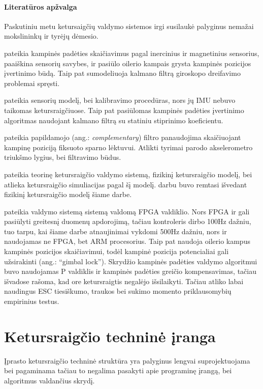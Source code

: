 \documentclass[12pt, a4paper, lithuanian, final]{article}
\begin{document}
\paragraph{Literatūros apžvalga}

Paskutiniu metu ketursaigčių valdymo sistemos irgi susilaukė palyginus nemažai mokslininkų ir tyrėjų dėmesio.

\cite{abyarjoo2015implementing} pateikia kampinės padėties skaičiavimus pagal inercinius ir magnetinius sensorius, paaiškina sensorių savybes, ir pasiūlo oilerio kampais grysta kampinės pozicijos įvertinimo būdą.
Taip pat sumodeliuoja kalmano filtrą giroskopo dreifavimo problemai spręsti.


\cite{kumar2004estimation} pateikia sensorių modelį, bei kalibravimo procedūras, nors jų IMU nebuvo taikomas ketursraigčiuose.
Taip pat pasiūlomas kampinės padėties įvertinimo algoritmas naudojant kalmano filtrą su statiniu stiprinimo koeficientu.

\cite{euston2008complementary} pateikia papildamojo (ang.: \textit{complementary}) filtro panaudojima skaičiuojant kampinę poziciją fiksuoto sparno lėktuvui.
Atlikti tyrimai parodo akselerometro triukšmo lygius, bei filtravimo būdus.

\cite{gibiansky2010quadcopter} pateikia teorinę ketursraigčio valdymo sistemą, fizikinį ketursraigčio modelį, bei atlieka ketursraigčio simuliacijas pagal šį modelį.
\cite{gibiansky2010quadcopter} darbu buvo remtasi išvedant fizikinį ketursraigčio modelį šiame darbe.

\cite{magnussen2011modeling} pateikia valdymo sistemą sistemą valdomą FPGA valdiklio.
Nors FPGA ir gali pasiūlyti greitesnį duomenų apdorojimą, tačiau \cite{magnussen2011modeling} kontroleris dirbo 100Hz dažniu, tuo tarpu, kai šiame darbe atnaujinimai vykdomi 500Hz dažniu, nors ir naudojamas ne FPGA, bet ARM procesorius.
Taip pat \cite{magnussen2011modeling} naudoja oilerio kampus kampinės pozicijos skaičiavimui, todėl kampinė pozicija potencialiai gali užsirakinti (ang.: "`gimbal lock"').
Skrydžio kampinės padėties valdymo algoritmui buvo naudojamas P valdiklis ir kampinės padėties greičio kompensavimas, tačiau išvadose rašoma, kad ore ketursraigtis negalėjo išsilaikyti.
Tačiau \cite{magnussen2011modeling} atliko labai naudingus ESC tiesiškumo, traukos bei sukimo momento priklausomybių empirinius testus.





\section{Ketursraigčio techninė įranga}
\label{skyr-hardware}
Įprasto ketursraigčio techninė struktūra yra palyginus lengvai suprojektuojama bei pagaminama tačiau to negalima pasakyti apie programinę įrangą, bei algoritmus valdančius skrydį.
\end{document}
